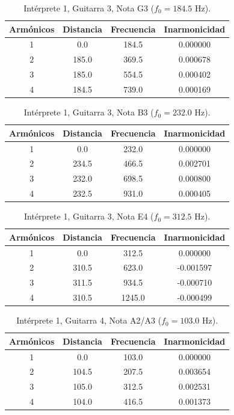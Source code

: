 \begin{table}[htbp]
  \centering
 \small
  \caption{Intérprete 1, Guitarra 3, Nota G3 ($f_0 = 184.5$ Hz).}
  \label{tab:interprete1_g3_g3}
  \begin{tabular}{cccc}
  \toprule
  Armónicos & Distancia & Frecuencia & Inarmonicidad \\
  \midrule
  1 & 0.0 & 184.5 & 0.000000 \\
  2 & 185.0 & 369.5 & 0.000678 \\
  3 & 185.0 & 554.5 & 0.000402 \\
  4 & 184.5 & 739.0 & 0.000169 \\
  \bottomrule
  \end{tabular}
\end{table}

\begin{table}[htbp]
  \centering
 \small
  \caption{Intérprete 1, Guitarra 3, Nota B3 ($f_0 = 232.0$ Hz).}
  \label{tab:interprete1_g3_b3}
  \begin{tabular}{cccc}
  \toprule
  Armónicos & Distancia & Frecuencia & Inarmonicidad \\
  \midrule
  1 & 0.0 & 232.0 & 0.000000 \\
  2 & 234.5 & 466.5 & 0.002701 \\
  3 & 232.0 & 698.5 & 0.000800 \\
  4 & 232.5 & 931.0 & 0.000405 \\
  \bottomrule
  \end{tabular}
\end{table}

\begin{table}[htbp]
  \centering
 \small
  \caption{Intérprete 1, Guitarra 3, Nota E4 ($f_0 = 312.5$ Hz).}
  \label{tab:interprete1_g3_e4}
  \begin{tabular}{cccc}
  \toprule
  Armónicos & Distancia & Frecuencia & Inarmonicidad \\
  \midrule
  1 & 0.0 & 312.5 & 0.000000 \\
  2 & 310.5 & 623.0 & -0.001597 \\
  3 & 311.5 & 934.5 & -0.000710 \\
  4 & 310.5 & 1245.0 & -0.000499 \\
  \bottomrule
  \end{tabular}
\end{table}

\begin{table}[htbp]
  \centering
 \small
  \caption{Intérprete 1, Guitarra 4, Nota A2/A3 ($f_0 = 103.0$ Hz).}
  \label{tab:interprete1_g4_a2_a3}
  \begin{tabular}{cccc}
  \toprule
  Armónicos & Distancia & Frecuencia & Inarmonicidad \\
  \midrule
  1 & 0.0 & 103.0 & 0.000000 \\
  2 & 104.5 & 207.5 & 0.003654 \\
  3 & 105.0 & 312.5 & 0.002531 \\
  4 & 104.0 & 416.5 & 0.001373 \\
  \bottomrule
  \end{tabular}
\end{table}

